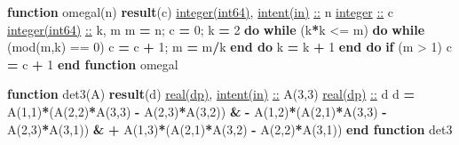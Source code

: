 \documentclass[10pt]{article}
\renewcommand{\_}{\origunderscore\allowbreak}
\newenvironment{Shaded}{}{}
\newcommand{\BuiltInTok}[1]{#1}
\newcommand{\DataTypeTok}[1]{\underline{#1}}
\newcommand{\DecValTok}[1]{#1}
\newcommand{\KeywordTok}[1]{\textbf{#1}}
\newcommand{\NormalTok}[1]{#1}
\newcommand{\OperatorTok}[1]{#1}
\begin{document}
\begin{Shaded}
\begin{Highlighting}[]
  \KeywordTok{function}\NormalTok{ omega\_l(n) }\KeywordTok{result}\NormalTok{(c)}
    \DataTypeTok{integer(int64)}\NormalTok{, }\DataTypeTok{intent(in)} \DataTypeTok{::}\NormalTok{ n}
    \DataTypeTok{integer} \DataTypeTok{::}\NormalTok{ c}
    \DataTypeTok{integer(int64)} \DataTypeTok{::}\NormalTok{ k, m}
\NormalTok{    m }\KeywordTok{=}\NormalTok{ n; c }\KeywordTok{=} \DecValTok{0}\NormalTok{; k }\KeywordTok{=} \DecValTok{2}
    \KeywordTok{do} \KeywordTok{while}\NormalTok{ (k}\KeywordTok{*}\NormalTok{k }\OperatorTok{\textless{}=}\NormalTok{ m)}
       \KeywordTok{do} \KeywordTok{while}\NormalTok{ (}\BuiltInTok{mod}\NormalTok{(m,k) }\OperatorTok{==} \DecValTok{0}\NormalTok{)}
\NormalTok{          c }\KeywordTok{=}\NormalTok{ c }\KeywordTok{+} \DecValTok{1}\NormalTok{; m }\KeywordTok{=}\NormalTok{ m}\KeywordTok{/}\NormalTok{k}
       \KeywordTok{end do}
\NormalTok{       k }\KeywordTok{=}\NormalTok{ k }\KeywordTok{+} \DecValTok{1}
    \KeywordTok{end do}
    \KeywordTok{if}\NormalTok{ (m }\OperatorTok{\textgreater{}} \DecValTok{1}\NormalTok{) c }\KeywordTok{=}\NormalTok{ c }\KeywordTok{+} \DecValTok{1}
  \KeywordTok{end function}\NormalTok{ omega\_l}

  \KeywordTok{function}\NormalTok{ det3(A) }\KeywordTok{result}\NormalTok{(d)}
    \DataTypeTok{real(dp)}\NormalTok{, }\DataTypeTok{intent(in)} \DataTypeTok{::}\NormalTok{ A(}\DecValTok{3}\NormalTok{,}\DecValTok{3}\NormalTok{)}
    \DataTypeTok{real(dp)} \DataTypeTok{::}\NormalTok{ d}
\NormalTok{    d }\KeywordTok{=}\NormalTok{ A(}\DecValTok{1}\NormalTok{,}\DecValTok{1}\NormalTok{)}\KeywordTok{*}\NormalTok{(A(}\DecValTok{2}\NormalTok{,}\DecValTok{2}\NormalTok{)}\KeywordTok{*}\NormalTok{A(}\DecValTok{3}\NormalTok{,}\DecValTok{3}\NormalTok{) }\KeywordTok{{-}}\NormalTok{ A(}\DecValTok{2}\NormalTok{,}\DecValTok{3}\NormalTok{)}\KeywordTok{*}\NormalTok{A(}\DecValTok{3}\NormalTok{,}\DecValTok{2}\NormalTok{)) }\KeywordTok{\&}
      \KeywordTok{{-}}\NormalTok{ A(}\DecValTok{1}\NormalTok{,}\DecValTok{2}\NormalTok{)}\KeywordTok{*}\NormalTok{(A(}\DecValTok{2}\NormalTok{,}\DecValTok{1}\NormalTok{)}\KeywordTok{*}\NormalTok{A(}\DecValTok{3}\NormalTok{,}\DecValTok{3}\NormalTok{) }\KeywordTok{{-}}\NormalTok{ A(}\DecValTok{2}\NormalTok{,}\DecValTok{3}\NormalTok{)}\KeywordTok{*}\NormalTok{A(}\DecValTok{3}\NormalTok{,}\DecValTok{1}\NormalTok{)) }\KeywordTok{\&}
      \KeywordTok{+}\NormalTok{ A(}\DecValTok{1}\NormalTok{,}\DecValTok{3}\NormalTok{)}\KeywordTok{*}\NormalTok{(A(}\DecValTok{2}\NormalTok{,}\DecValTok{1}\NormalTok{)}\KeywordTok{*}\NormalTok{A(}\DecValTok{3}\NormalTok{,}\DecValTok{2}\NormalTok{) }\KeywordTok{{-}}\NormalTok{ A(}\DecValTok{2}\NormalTok{,}\DecValTok{2}\NormalTok{)}\KeywordTok{*}\NormalTok{A(}\DecValTok{3}\NormalTok{,}\DecValTok{1}\NormalTok{))}
  \KeywordTok{end function}\NormalTok{ det3}


\end{Highlighting}
\end{Shaded}
\end{document}

